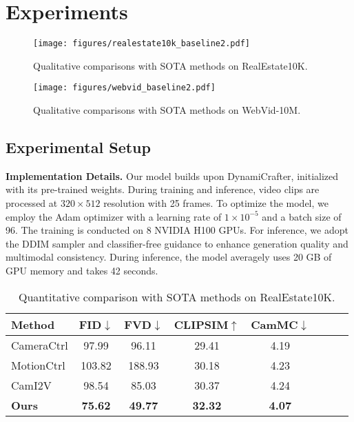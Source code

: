 \section{Experiments}



\begin{figure*}[t]
    \centering
    \texttt{[image: figures/realestate10k\_baseline2.pdf]}
    \caption{Qualitative comparisons with SOTA methods on RealEstate10K.}
    \label{fig:qual_realestate10k}
\end{figure*}


\begin{figure*}
    \centering
    \texttt{[image: figures/webvid\_baseline2.pdf]}
    \caption{Qualitative comparisons with SOTA methods on WebVid-10M.}
    \label{fig:qual_webvid10m}
\end{figure*}



\subsection{Experimental Setup}
\noindent \textbf{Implementation Details.}
Our model builds upon DynamiCrafter, initialized with its pre-trained weights. During training and inference, video clips are processed at $320 \times 512$ resolution with 25 frames. To optimize the model, we employ the Adam optimizer with a learning rate of $1 \times 10^{-5}$ and a batch size of 96. The training is conducted on 8 NVIDIA H100 GPUs. For inference, we adopt the DDIM sampler and classifier-free guidance to enhance generation quality and multimodal consistency. During inference, the model averagely uses 20 GB of GPU memory and takes 42 seconds.


\setlength{\tabcolsep}{4pt}
\begin{table}[t]
\vspace{-5pt}
\scriptsize
\centering
\begin{tabular}{lccccccc}
\toprule
\textbf{Method} & FID$\downarrow$    & FVD$\downarrow$    & CLIPSIM$\uparrow$ & CamMC$\downarrow$ \\
\midrule
CameraCtrl  & 97.99          & 96.11          & 29.41   &  4.19  \\
MotionCtrl  & 103.82         & 188.93         & 30.18            &  4.23           \\
CamI2V          & 98.54 & 85.03 & 30.37            &  4.24           \\
\rowcolor[HTML]{EFEFEF}
\textbf{Ours}   & \textbf{75.62}             &     \textbf{49.77}       &  \textbf{32.32}          &  \textbf{4.07}            \\
\bottomrule
\end{tabular}
\caption{Quantitative comparison with SOTA methods on RealEstate10K.}
\label{tab:result_realestate10k}
\vspace{-5pt}
\end{table}


